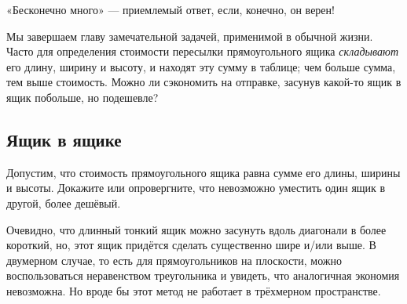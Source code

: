  «Бесконечно много» --- приемлемый ответ, если, конечно, он верен!

\medskip

Мы завершаем главу замечательной задачей, применимой в обычной жизни.
Часто для определения стоимости пересылки прямоугольного ящика \emph{складывают} его длину, ширину и высоту,
и находят эту сумму в таблице;
чем больше сумма, тем выше стоимость.
Можно ли сэкономить на отправке, засунув какой-то ящик в ящик побольше, но подешевле?

\subsection*{Ящик в ящике}\label{Ящик в ящике}

Допустим, что стоимость прямоугольного ящика равна сумме его длины, ширины и высоты.
Докажите или опровергните, что невозможно уместить один ящик в другой, более дешёвый.

Очевидно, что длинный тонкий ящик можно засунуть вдоль диагонали в более короткий,
но, этот ящик придётся сделать существенно шире и/или выше.
В двумерном случае, то есть для прямоугольников на плоскости, можно воспользоваться неравенством треугольника и увидеть, что аналогичная экономия невозможна.
Но вроде бы этот метод не работает в трёхмерном пространстве.
